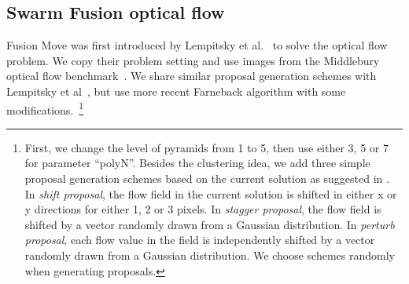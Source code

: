 \subsection{Swarm Fusion optical flow}

Fusion Move was first introduced by Lempitsky et al.~\cite{fusion_flow} to
solve the optical flow problem.
We copy their problem setting and use images from the Middlebury optical
flow benchmark~\cite{middlebury_optical_flow}. We share similar proposal
generation schemes with Lempitsky et al~\cite{fusion_flow}, but
use more recent Farneback algorithm with some modifications.~\footnote{First, we
  change the level of pyramids from 1 to 5, then use either 3, 5 or 7 for
parameter ``polyN''. Besides the clustering idea, we add three simple
proposal generation schemes based on the current solution as suggested
in \cite{fusion_flow}. In \textit{shift proposal}, the flow field in the
current solution is shifted in either x or y directions for
either 1, 2 or 3 pixels. In \textit{stagger proposal}, the flow field is
shifted by a vector randomly drawn from a Gaussian distribution. In
\textit{perturb proposal}, each flow value in the field is
independently shifted by a vector randomly drawn from a Gaussian
distribution. We choose schemes randomly when generating proposals.}


